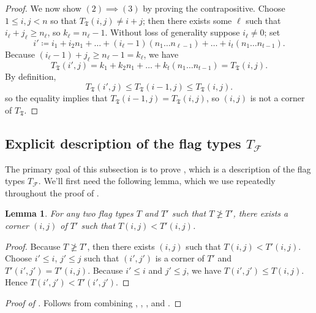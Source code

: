 \documentclass[letterpaper,10pt]{amsart}
\newcommand{\mfT}{\mathfrak{T}}
\newcommand{\cF}{\mathcal{F}}
\newtheorem{lemma}[theorem]{Lemma}
\theoremstyle{definition}
\theoremstyle{remark}
\begin{document}
\begin{proof}
We now show $(2) \implies (3)$ by proving the contrapositive. Choose $1 \leq i,j < n$ so that $T_{\mfT}(i,j) \neq i+j$; then there exists some $\ell$ such that $i_{\ell} + j_{\ell} \geq n_{\ell}$, so $k_{\ell} = n_{\ell} - 1$. Without loss of generality suppose $i_{\ell} \neq 0$; set 
\[
    i' \coloneqq i_1 + i_2 n_1 + \dots + (i_{\ell}-1) (n_1\dots n_{\ell-1}) + \dots + i_t(n_1\dots n_{t-1}).
\]
Because $(i_{\ell}-1) + j_{\ell} \geq n_{\ell} - 1 = k_{\ell}$, we have 
\begin{equation}
\label{eqn:equality}
T_{\mfT}(i',j) = k_1 + k_2 n_1 + \dots + k_t(n_1\dots n_{t-1}) = T_{\mfT}(i,j). 
\end{equation}
By definition,
\[
    T_{\mfT}(i',j) \leq T_{\mfT}(i-1,j) \leq T_{\mfT}(i,j).
\]
so the equality  implies that $T_{\mfT}(i-1,j) = T_{\mfT}(i,j)$, so $(i,j)$ is not a corner of $T_{\mfT}$.
\end{proof}

\subsection{Explicit description of the flag types $T_{\cF}$}
\label{subsec:flag-types}
The primary goal of this subsection is to prove , which is a description of the flag types $T_{\cF}$. We'll first need the following lemma, which we use repeatedly throughout the proof of .

\begin{lemma}
\label{lem:test-flag-type-inequal}
For any two flag types $T$ and $T'$ such that $T \not \geq T'$, there exists a corner $(i,j)$ of $T'$ such that $T(i,j) < T'(i,j)$.
\end{lemma}
\begin{proof}
Because $T \not \geq T'$, then there exists $(i,j)$ such that $T(i,j) < T'(i,j)$. Choose $i' \leq i$, $j' \leq j$ such that $(i',j')$ is a corner of $T'$ and $T'(i',j') = T'(i,j)$. Because $i' \leq i$ and $j' \leq j$, we have $T(i',j') \leq T(i,j)$. Hence $T(i',j') < T'(i',j')$.
\end{proof}

\begin{proof}[Proof of ]
Follows from combining , , , and .
\end{proof}
\end{document}
